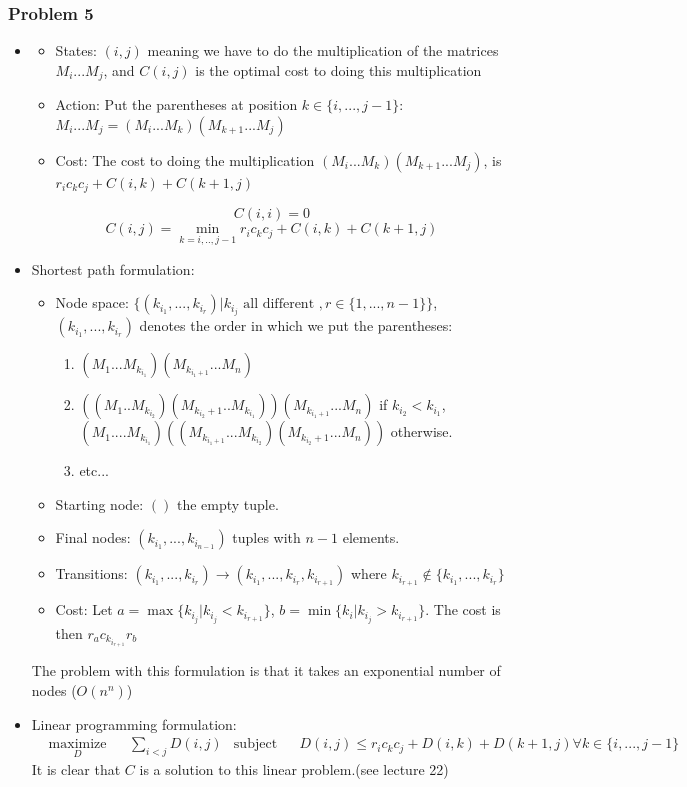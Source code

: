 \documentclass[12pt]{article}
\newcommand{\Q}[1]{\subsubsection*{Problem #1}}
\begin{document}
\Q{5}
\begin{itemize}
\item 
  \begin{itemize}
  \item States: $(i, j)$ meaning we have to do the multiplication of the matrices $M_i...M_j$, and $C(i, j)$ is the optimal cost to doing this multiplication
  \item Action: Put the parentheses at position $k \in \{i, ..., j-1\}$: $M_i...M_j = (M_i... M_k)(M_{k+1}...M_j)$
  \item Cost: The cost to doing the multiplication $(M_i... M_k)(M_{k+1}...M_j)$, is $r_ic_kc_j + C(i, k) + C(k+1, j)$
  \end{itemize}
  $$C(i, i) = 0$$
  $$C(i, j) = \min_{k = i,..,j-1} r_ic_kc_j + C(i, k) + C(k+1, j)$$
\item

  Shortest path formulation:

  \begin{itemize}
  \item Node space:  $\{ (k_{i_1}, ..., k_{i_r}) | k_{i_j} \text{ all different },r \in \{1, ..., n-1\} \}$, $(k_{i_1}, ..., k_{i_r})$ denotes the order in which we put the parentheses:
    \begin{enumerate}
    \item $(M_1 ... M_{k_{i_1}})( M_{k_{i_1+1}} ... M_n)$
    \item $( (M_1 .. M_{k_{i_2}})(M_{k_{i_2}+1} .. M_{k_{i_1}}))( M_{k_{i_1+1}} ... M_n)$ if $k_{i_2} < k_{i_1}$,
      $(M_1 ..  .. M_{k_{i_1}})( (M_{k_{i_1+1}} ... M_{k_{i_2}})(M_{k_{i_2}+1} ... M_n))$ otherwise.
    \item etc...
    \end{enumerate}
  \item Starting node: $()$ the empty tuple.
  \item Final nodes: $(k_{i_1}, ..., k_{i_{n-1}})$ tuples with $n-1$ elements.
  \item Transitions: $(k_{i_1}, ..., k_{i_r}) \rightarrow (k_{i_1}, ..., k_{i_r}, k_{i_{r+1}})$ where $k_{i_{r+1}} \not \in \{k_{i_1}, ..., k_{i_r}\}$
  \item Cost: Let $a = \max\{ k_{i_j}| k_{i_j} < k_{i_{r+1}}\}$, $b = \min\{ k_i | k_{i_j} > k_{i_{r+1}}\}$.
    The cost is then $r_ac_{k_{i_{r+1}}}r_b$
  \end{itemize}
  The problem with this formulation is that it takes an exponential number of nodes ($O(n^n)$)
  
\item Linear programming formulation:
    \begin{equation*}
    \begin{aligned}
      & \underset{D}{\text{maximize}}
      & & \sum_{i < j} D(i,j)
      & \text{subject to}
      & & D(i,j) \le r_i c_k c_j +  D(i,k) + D(k+1, j) \forall k \in \{i, ..., j-1\}
    \end{aligned}
  \end{equation*}
It is clear that $C$ is a solution to this linear problem.(see lecture 22)
\end{itemize}
\end{document}
